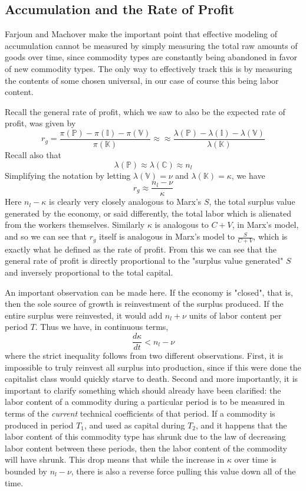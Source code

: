 \subsection{Accumulation and the Rate of Profit}
Farjoun and Machover make the important point that effective modeling of accumulation cannot be measured by simply measuring the total raw amounts of goods over time, since commodity types are constantly being abandoned in favor of new commodity types. The only way to effectively track this is by measuring the contents of some chosen universal, in our case of course this being labor content. \par 
Recall the general rate of profit, which we saw to also be the expected rate of profit, was given by
\[  r_g = \frac{\pi(\mathbb{P}) - \pi(\mathbb{I}) - \pi(\mathbb{V})}{\pi(\mathbb{K})} \approx \approx \frac{\lambda(\mathbb{P}) - \lambda(\mathbb{I}) - \lambda(\mathbb{V})}{\lambda(\mathbb{K})}  \]
Recall also that 
\[ \lambda(\mathbb{P}) \approx \lambda(\mathbb{C}) \approx n_l \]
Simplifying the notation by letting $\lambda(\mathbb{V}) = \nu$ and $\lambda(\mathbb{K}) = \kappa$, we have
\[  r_g \approx \frac{n_l - \nu}{\kappa} \]
Here $n_l - \kappa$ is clearly very closely analogous to Marx's $S$, the total surplus value generated by the economy, or said differently, the total labor which is alienated from the workers themselves. Similarly $\kappa$ is analogous to $C+V$, in Marx's model, and so we can see that $r_g$ itself is analogous in Marx's model to $\frac{S}{C+V}$, which is exactly what he defined as the rate of profit. From this we can see that the general rate of profit is directly proportional to the "surplus value generated" $S$ and inversely proportional to the total capital. \par 
An important observation can be made here. If the economy is "closed", that is, then the sole source of growth is reinvestment of the surplus produced. If the entire surplus were reinvested, it would add $n_l+\nu$ units of labor content per period $T$. Thus we have, in continuous terms,
\[ \frac{d\kappa}{dt} < n_l-\nu \]
where the strict inequality follows from two different observations. First, it is impossible to truly reinvest all surplus into production, since if this were done the capitalist class would quickly starve to death. Second and more importantly, it is important to clarify something which should already have been clarified: the labor content of a commodity during a particular period is to be measured in terms of the \textit{current} technical coefficients of that period. If a commodity is produced in period $T_1$, and used as capital during $T_2$, and it happens that the labor content of this commodity type has shrunk due to the law of decreasing labor content between these periods, then the labor content of the commodity will have shrunk. This drop means that while the increase in $\kappa$ over time is bounded by $n_l-\nu$, there is also a reverse force pulling this value down all of the time. \par 
